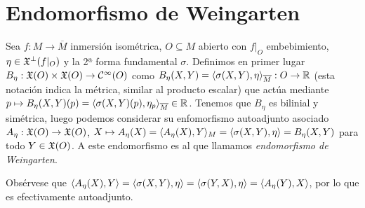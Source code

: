 \documentclass[GSR.tex]{subfiles}
\begin{document}
\section{Endomorfismo de Weingarten}
Sea $f:M\to\overline{M}$ inmersión isométrica, $O\subseteq M$ abierto con $f|_O$ embebimiento, $\eta\in{\mathfrak{X}}^\perp(f|_O)$ y la 2ª forma fundamental $\sigma$. Definimos en primer lugar $B_\eta:{\mathfrak{X}}(O)\times{\mathfrak{X}}(O)\to\mathcal{C}^{\infty}(O)$ como $B_\eta(X,Y)=\langle{\sigma(X,Y),\eta}\rangle_{\overline{M}}:O\to\mathbb{R}$ (esta notación indica la métrica, similar al producto escalar) que actúa mediante $p\mapsto B_\eta(X,Y)(p)=\langle{\sigma(X,Y)(p),\eta_p}\rangle_{\overline{M}}\in\mathbb{R}$. Tenemos que $B_\eta$ es bilinial y simétrica, luego podemos considerar su enfomorfismo autoadjunto asociado $A_\eta:{\mathfrak{X}}(O)\to {\mathfrak{X}}(O)$, $X\mapsto A_\eta(X)=\langle{A_\eta(X),Y}\rangle_M=\langle{\sigma(X,Y),\eta}\rangle=B_\eta(X,Y)$ para todo $Y\in{\mathfrak{X}}(O)$. A este endomorfismo es al que llamamos \emph{endomorfismo de Weingarten}. 

Obsérvese que $\langle{A_\eta(X),Y}\rangle=\langle{\sigma(X,Y),\eta}\rangle=\langle{\sigma(Y,X),\eta}\rangle=\langle{A_\eta(Y),X}\rangle$, por lo que es efectivamente autoadjunto. 
\end{document}
